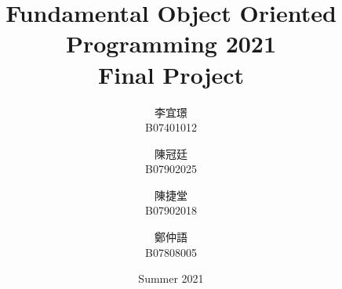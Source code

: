 \title{Fundamental Object Oriented Programming 2021 \\ Final Project} %
\author{
    李宜璟\\B07401012\\
    \and
    陳冠廷\\B07902025\\
    \and
    陳捷堂\\B07902018\\
    \and
    鄭仲語\\B07808005\\
}
\date{Summer 2021}
\begin{titlingpage}
\null  %
\nointerlineskip  %
\vfill
\let\snewpage \newpage
\let\newpage \relax
\maketitle
\thispagestyle{empty}
\let \newpage \snewpage
\vfill 
\break %
\end{titlingpage}

